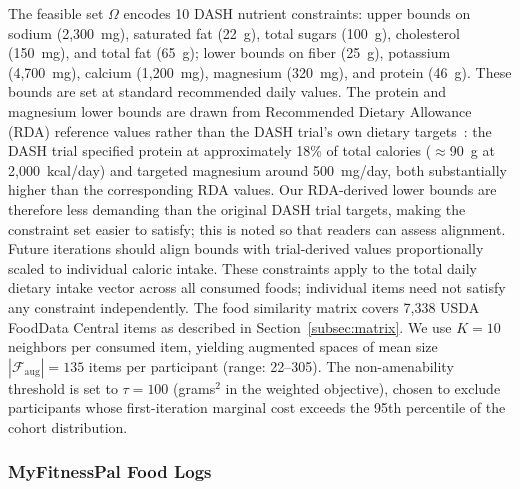 \documentclass[journal]{IEEEtran}
\newcommand{\Faug}{\mathcal{F}_{\mathrm{aug}}}
\begin{document}
The feasible set $\Omega$ encodes 10 DASH nutrient constraints: upper
bounds on sodium (2,300~mg), saturated fat (22~g), total sugars (100~g),
cholesterol (150~mg), and total fat (65~g); lower bounds on fiber (25~g),
potassium (4,700~mg), calcium (1,200~mg), magnesium (320~mg), and
protein (46~g). These bounds are set at standard recommended daily
values. The protein and magnesium lower bounds are drawn from Recommended
Dietary Allowance (RDA) reference values rather than the DASH trial's own dietary
targets~\cite{sacks2001effects}: the DASH trial specified protein at
approximately 18\% of total calories ($\approx$90~g at 2,000~kcal/day)
and targeted magnesium around 500~mg/day, both substantially higher than
the corresponding RDA values. Our RDA-derived lower bounds are therefore
less demanding than the original DASH trial targets, making the
constraint set easier to satisfy; this is noted so that readers can
assess alignment. Future iterations should align bounds with
trial-derived values proportionally scaled to individual caloric intake.
These constraints apply to the total daily dietary intake vector
across all consumed foods; individual items need not satisfy any
constraint independently.
The food similarity matrix covers 7,338 USDA
FoodData Central items as described in Section~\ref{subsec:matrix}. We
use $K{=}10$ neighbors per consumed item, yielding augmented spaces of
mean size $|\Faug| = 135$ items per participant (range: 22--305).
The non-amenability threshold is set to $\tau = 100$ (grams$^2$ in the
weighted objective), chosen to exclude participants whose first-iteration
marginal cost exceeds the 95th percentile of the cohort distribution.

\subsubsection{MyFitnessPal Food Logs}
\label{subsubsec:mfp_setup}
\end{document}
